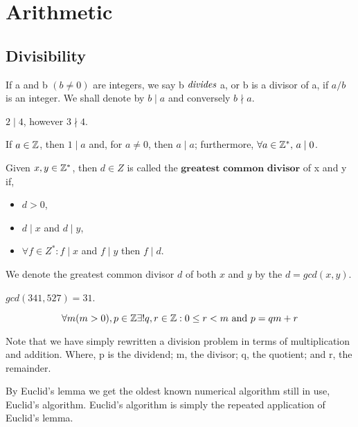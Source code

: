 \section{Arithmetic} %
\label{sec:arithmetic}

\subsection{Divisibility}
If a and b $(b \neq 0)$ are integers, we say b $\emph{divides}$ a, or b is a divisor of a,
if $a/b$ is an integer. We shall denote by $b \mid a$ and conversely $b \nmid a$.

\begin{exmp}
 $2 \mid 4$, however $3 \nmid 4$.
\end{exmp}

\begin{exmp}
 If $a \in \mathbb{Z}$, then $1 \mid a$ and, for $a \neq 0$, then $a \mid a$; furthermore, $\forall a \in \mathbb{Z}^*, \, a \mid 0$.
\end{exmp}

\begin{defn}
 Given $x, y \in \mathbb{Z}^*$, then $d \in Z$ is called the $\textbf{greatest common divisor}$ of x and y if,
 \begin{itemize}
  \item $d > 0$,
  \item $d \mid x$ and $d \mid y$,
  \item $\forall f \in Z^* : f \mid x$ and $f \mid y$ then $f \mid d$.
 \end{itemize}
\end{defn}
We denote the greatest common divisor $d$ of both $x$ and $y$ by the $d = gcd(x,y)$.

\begin{exmp}
 $gcd(341,527) = 31$.
\end{exmp}

\begin{lem}
	\[
		\forall m (m > 0), p \in \mathbb{Z} \exists ! q, r \in \mathbb{Z} : 0 \leq r < m \text{ and } p = qm + r
	\]
\end{lem}
Note that we have simply rewritten a division problem in terms of multiplication and addition.
Where, p is the dividend; m, the divisor; q, the quotient; and r, the remainder.

By Euclid's lemma we get the oldest known numerical algorithm still in use, Euclid's algorithm.
Euclid's algorithm is simply the repeated application of Euclid's lemma.

